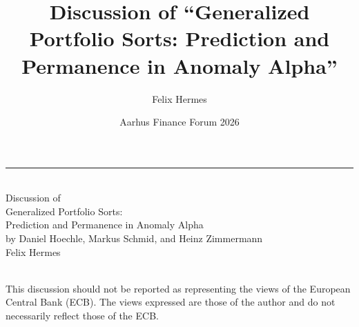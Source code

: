 \documentclass[aspectratio=169,10pt]{beamer}
\title[Discussion of Hoechle, Schmid, and Zimmermann]{Discussion of ``Generalized Portfolio Sorts: Prediction and Permanence in Anomaly Alpha''}
\author[Felix Hermes]{Felix Hermes}
\institute[]{Goethe University Frankfurt \quad European Central Bank}
\date{Aarhus Finance Forum 2026}
\begin{document}
\begin{frame}
  \vfill
  \begin{center}
    {\color{goetheblue}\rule{0.16\textwidth}{2.2pt}}\\[0.9em]
    {\color{softgrey}\large Discussion of}\\[0.7em]
    {Generalized Portfolio Sorts:\\[2pt] Prediction and Permanence in Anomaly Alpha}\\[0.9em]
    {\large by Daniel Hoechle, Markus Schmid, and Heinz Zimmermann}\\[1.7em]
    {\large Felix Hermes}\\[0.5em]
    {\color{softgrey}\insertinstitute}\\[1.4em]
    {\color{softgrey}\insertdate}
  \end{center}
  \vfill
  \begin{center}
    {\scriptsize\color{softgrey} This discussion should not be reported as representing the views of the European Central Bank (ECB). The views expressed are those of the author and do not necessarily reflect those of the ECB.}
  \end{center}
\end{frame}
\end{document}
